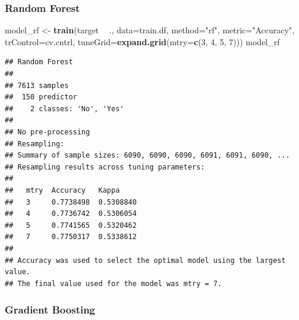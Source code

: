 \documentclass[
]{article}
\newenvironment{Shaded}{\begin{snugshade}}{\end{snugshade}}
\newcommand{\DataTypeTok}[1]{\textcolor[rgb]{0.13,0.29,0.53}{#1}}
\newcommand{\DecValTok}[1]{\textcolor[rgb]{0.00,0.00,0.81}{#1}}
\newcommand{\KeywordTok}[1]{\textcolor[rgb]{0.13,0.29,0.53}{\textbf{#1}}}
\newcommand{\NormalTok}[1]{#1}
\newcommand{\OperatorTok}[1]{\textcolor[rgb]{0.81,0.36,0.00}{\textbf{#1}}}
\newcommand{\StringTok}[1]{\textcolor[rgb]{0.31,0.60,0.02}{#1}}
\begin{document}
\hypertarget{random-forest}{%
\subsubsection{Random Forest}\label{random-forest}}

\begin{Shaded}
\begin{Highlighting}[]
\NormalTok{model_rf <-}\StringTok{ }\KeywordTok{train}\NormalTok{(target }\OperatorTok{~}\StringTok{ }\NormalTok{., }\DataTypeTok{data=}\NormalTok{train.df,}
                      \DataTypeTok{method=}\StringTok{"rf"}\NormalTok{,}
                      \DataTypeTok{metric=}\StringTok{"Accuracy"}\NormalTok{,}
                      \DataTypeTok{trControl=}\NormalTok{cv.cntrl,}
                      \DataTypeTok{tuneGrid=}\KeywordTok{expand.grid}\NormalTok{(}\DataTypeTok{mtry=}\KeywordTok{c}\NormalTok{(}\DecValTok{3}\NormalTok{, }\DecValTok{4}\NormalTok{, }\DecValTok{5}\NormalTok{, }\DecValTok{7}\NormalTok{)))}
\NormalTok{model_rf}
\end{Highlighting}
\end{Shaded}

\begin{verbatim}
## Random Forest 
## 
## 7613 samples
##  150 predictor
##    2 classes: 'No', 'Yes' 
## 
## No pre-processing
## Resampling: 
## Summary of sample sizes: 6090, 6090, 6090, 6091, 6091, 6090, ... 
## Resampling results across tuning parameters:
## 
##   mtry  Accuracy   Kappa    
##   3     0.7738498  0.5308840
##   4     0.7736742  0.5306054
##   5     0.7741565  0.5320462
##   7     0.7750317  0.5338612
## 
## Accuracy was used to select the optimal model using the largest value.
## The final value used for the model was mtry = 7.
\end{verbatim}

\hypertarget{gradient-boosting}{%
\subsubsection{Gradient Boosting}\label{gradient-boosting}}
\end{document}
